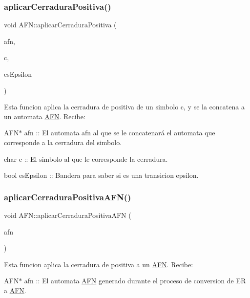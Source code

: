 \subsubsection{\texorpdfstring{aplicar\+Cerradura\+Positiva()}{aplicarCerraduraPositiva()}}
{\footnotesize\ttfamily void A\+F\+N\+::aplicar\+Cerradura\+Positiva (\begin{DoxyParamCaption}\item[{\hyperlink{class_a_f_n}{A\+FN} $\ast$}]{afn,  }\item[{char}]{c,  }\item[{bool}]{es\+Epsilon }\end{DoxyParamCaption})}

Esta funcion aplica la cerradura de positiva de un simbolo c, y se la concatena a un automata \hyperlink{class_a_f_n}{A\+FN}. Recibe\+:
\begin{DoxyItemize}
\item A\+F\+N$\ast$ afn \+:\+: El automata afn al que se le concatenará el automata que corresponde a la cerradura del simbolo.
\item char c \+:\+: El simbolo al que le corresponde la cerradura.
\item bool es\+Epsilon \+:\+: Bandera para saber si es una transicion epsilon. 
\end{DoxyItemize}\mbox{\label{class_a_f_n_a951fb01c6437c633311aa15b1246a290}} 
\subsubsection{\texorpdfstring{aplicar\+Cerradura\+Positiva\+A\+F\+N()}{aplicarCerraduraPositivaAFN()}}
{\footnotesize\ttfamily void A\+F\+N\+::aplicar\+Cerradura\+Positiva\+A\+FN (\begin{DoxyParamCaption}\item[{\hyperlink{class_a_f_n}{A\+FN} $\ast$}]{afn }\end{DoxyParamCaption})}

Esta funcion aplica la cerradura de positiva a un \hyperlink{class_a_f_n}{A\+FN}. Recibe\+:
\begin{DoxyItemize}
\item A\+F\+N$\ast$ afn \+:\+: El automata \hyperlink{class_a_f_n}{A\+FN} generado durante el proceso de conversion de ER a \hyperlink{class_a_f_n}{A\+FN}. 
\end{DoxyItemize}\mbox{\label{class_a_f_n_a8435129e1a74e46b2727ddc087b7b3eb}} 
